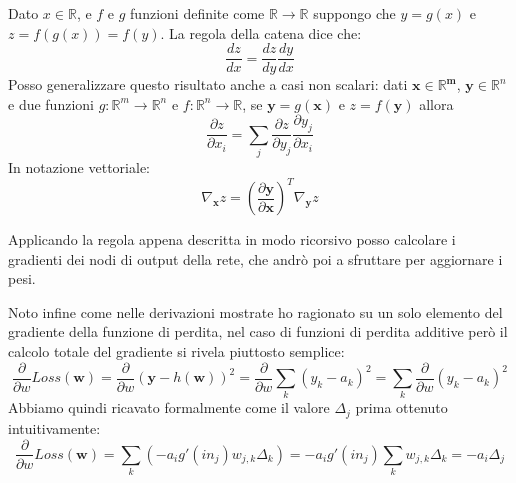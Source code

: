 \documentclass[../../main.tex]{subfiles}
\begin{document}
Dato $x \in \mathbb{R}$, e $f$ e $g$ funzioni definite come $\mathbb{R} \rightarrow \mathbb{R}$ suppongo che $y = g(x)$ e $z = f(g(x)) = f(y)$. La regola della catena dice che:
\[\frac{dz}{dx} = \frac{dz}{dy} \frac{dy}{dx}\]
Posso generalizzare questo risultato anche a casi non scalari: dati $\boldsymbol{x \in \mathbb{R}^m}$, $\boldsymbol{y} \in \mathbb{R}^n$ e due funzioni $g: \mathbb{R}^m \rightarrow \mathbb{R}^n$ e $f: \mathbb{R}^n \rightarrow \mathbb{R}$, se $\boldsymbol{y} = g(\boldsymbol{x})$ e $z = f(\boldsymbol{y})$ allora
\[\frac{\partial z}{\partial x_i} = \sum_j \frac{\partial z}{\partial y_j} \frac{\partial y_j}{\partial x_i}\]
In notazione vettoriale:
\[\nabla_{\boldsymbol{x}} z = \left(\frac{\partial \boldsymbol{y}}{\partial \boldsymbol{x}}\right)^T \nabla_{\boldsymbol{y}} z\]

Applicando la regola appena descritta in modo ricorsivo posso calcolare i gradienti dei nodi di output della rete, che andrò poi a sfruttare per aggiornare i pesi. 

Noto infine come nelle derivazioni mostrate ho ragionato su un solo elemento del gradiente della funzione di perdita, nel caso di funzioni di perdita additive però il calcolo totale del gradiente si rivela piuttosto semplice:
\[\frac{\partial}{\partial w} Loss(\boldsymbol{w}) = \frac{\partial}{\partial w} (\boldsymbol{y} - h(\boldsymbol{w}))^2 = \frac{\partial}{\partial w} \sum_k (y_k - a_k) ^ 2 = \sum_k \frac{\partial}{\partial w} (y_k - a_k) ^ 2\]
Abbiamo quindi ricavato formalmente come il valore $\Delta_j$ prima ottenuto intuitivamente:
\[\frac{\partial}{\partial w} Loss(\boldsymbol{w}) = \sum_k \left(-a_i g'(in_j) w_{j,k} \Delta_k \right) = -a_i g'(in_j) \sum_k w_{j,k} \Delta_k = -a_i \Delta_j \]
\end{document}
